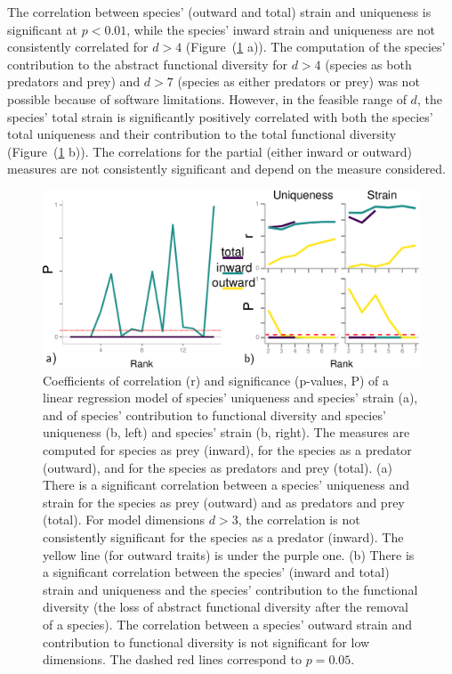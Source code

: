 \documentclass[]{rsos}%
\begin{document}
The correlation between species' (outward and total) strain and uniqueness is
significant at $p < 0.01$, while the species' inward strain and
uniqueness are not consistently correlated for $d > 4$ (Figure~(\ref{fig:strain_3} a)). 
The computation of the species' contribution to the abstract functional
diversity for $d > 4$ (species as both predators and
prey) and $d > 7$ (species as either predators or prey) was not possible because
of software limitations. However, in the feasible range of $d$, the species' total strain is
significantly positively correlated with both the species' total uniqueness
and their contribution to the total functional diversity (Figure~(\ref{fig:strain_3} b)). The
correlations for the partial (either inward or outward) measures are not consistently
significant and depend on the measure considered.

\begin{figure}[hbt]
 \centering
 \includegraphics[width=\textwidth]{./images/chap_2/Figure_3.pdf}
 \caption{Coefficients of correlation (r) and significance (p-values, P) of a linear regression model
 of species' uniqueness and species' strain (a), and of species' contribution to functional diversity
 and species' uniqueness (b, left) and species' strain (b, right). The measures are computed
 for species as prey (inward),  for the species as a predator (outward), and for the species as predators and prey (total).
 (a) There is a significant correlation between a species' uniqueness and strain for
the species as prey (outward) and as predators and prey (total). For
model dimensions $d > 3$, the correlation is not consistently
significant for the species as a predator (inward). The yellow line (for outward traits)
is under the purple one.
(b) There is a significant correlation between the species' (inward and total) strain and
uniqueness and the species' contribution to the functional diversity (the
loss of abstract functional diversity after the removal of a species). The correlation
between a species' outward strain and contribution to functional diversity is not significant for low dimensions.
The dashed red lines correspond to $p = 0.05$.}\label{fig:strain_3}
\end{figure}
\end{document}

